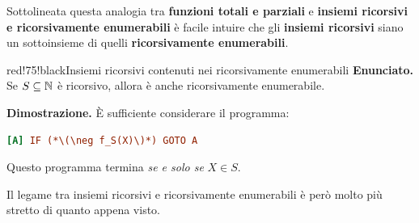 Sottolineata questa analogia tra \textbf{funzioni totali e parziali} e \textbf{insiemi ricorsivi e ricorsivamente enumerabili} è facile intuire che gli \textbf{insiemi ricorsivi} siano un sottoinsieme di quelli \textbf{ricorsivamente enumerabili}.
\begin{halfframedbox}{red!75!black}{Insiemi ricorsivi contenuti nei ricorsivamente enumerabili}\label{Ricorsivi Contenuti in Enumerabili}
  \textbf{Enunciato. } Se \(S \subseteq \mathbb{N}\) è ricorsivo, allora è anche ricorsivamente enumerabile.
  \begin{center}
    \textcolor{red!75!black}{\hdashrule[0.5ex]{18cm}{1pt}{3mm 3pt 1mm 2pt}}
  \end{center}
  \textbf{Dimostrazione. } È sufficiente considerare il programma:
  \begin{lstlisting}[language=ini, caption={ }]
  [A] IF (*\(\neg f_S(X)\)*) GOTO A
  \end{lstlisting}
  Questo programma termina \textit{se e solo se} \(X \in S\).
\end{halfframedbox}
\newpage

Il legame tra insiemi ricorsivi e ricorsivamente enumerabili è però molto più stretto di quanto appena visto.


